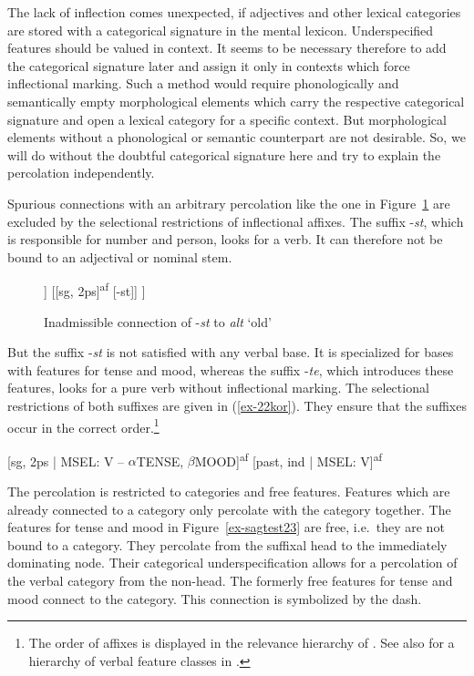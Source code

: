 \documentclass[output=paper
  ,nobabel
  ,draftmode
  ,colorlinks, citecolor=brown
]{langscibook}
\begin{document}
\noindent The lack of inflection comes unexpected, if adjectives and other lexical categories are stored with a categorical signature in the mental lexicon. Underspecified features should be valued in context. It seems to be necessary therefore to add the categorical signature later and assign it only in contexts which force inflectional marking. Such a method would require phonologically and semantically empty morphological elements which carry the respective categorical signature and open a lexical category for a specific context. But morphological elements without a phonological or semantic counterpart are not desirable. So, we will do without the doubtful categorical signature here and try to explain the percolation independently. 

Spurious connections with an arbitrary percolation like the one in Figure~\ref{ex-altst} are excluded by the selectional restrictions of inflectional affixes. The suffix -\emph{st}, which is responsible for number and person, looks for a verb. It can therefore not be bound to an adjectival or nominal stem.

\begin{figure}
\centering
\begin{forest}
	[\textsuperscript{$\ast$}{[A, sg, 2ps]}
		[A [alt]]
		[{[sg, 2ps]}\textsuperscript{af} [-st]]
	]
\end{forest}
\caption{Inadmissible connection of -\emph{st} to \emph{alt} `old'}\label{ex-altst}
\end{figure}


But the suffix -\emph{st} is not satisfied with any verbal base. It is specialized for bases with features for tense and mood, whereas the suffix -\emph{te}, which introduces these features, looks for a pure verb without inflectional marking. The selectional restrictions of both suffixes are given in (\ref{ex-22kor}). They ensure that the suffixes occur in the correct order.\footnote{The order of affixes is displayed in the relevance hierarchy of \citet{Bybee1985}. See also \citet[205]{Eisenberg2006} for a hierarchy of verbal feature classes in .}

\eal\label{ex-22kor}
\ex {} [sg, 2ps | MSEL: V – $\alpha$TENSE, $\beta$MOOD]\textsuperscript{af}
\ex {} [past, ind | MSEL: V]\textsuperscript{af}
\zl

\noindent The percolation is restricted to categories and free features. Features which are already connected to a category only percolate with the category together. The features for tense and mood in Figure~\ref{ex-sagtest23} are free, i.e.\ they are not bound to a category. They percolate from the suffixal head to the immediately dominating node. Their categorical underspecification allows for a percolation of the verbal category from the non-head. The formerly free features for tense and mood connect to the category. This connection is symbolized by the dash.
\end{document}
